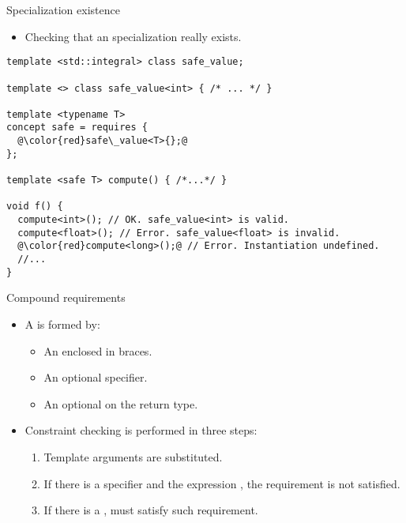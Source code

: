 \begin{frame}[t,fragile]{Specialization existence} 
\begin{itemize}
  \item Checking that an specialization really exists.
\end{itemize}
\begin{lstlisting}[escapechar=@]
template <std::integral> class safe_value;

template <> class safe_value<int> { /* ... */ }

template <typename T>
concept safe = requires {
  @\color{red}safe\_value<T>{};@
};

template <safe T> compute() { /*...*/ }

void f() {
  compute<int>(); // OK. safe_value<int> is valid.
  compute<float>(); // Error. safe_value<float> is invalid.
  @\color{red}compute<long>();@ // Error. Instantiation undefined.
  //...
}
\end{lstlisting}
\end{frame}

\begin{frame}[t,fragile]{Compound requirements}
\begin{itemize}
  \item A  is formed by:
    \begin{itemize}
      \item An  enclosed in braces.
      \item An optional  specifier.
      \item An optional  on the return type.
    \end{itemize}

  \item Constraint checking is performed in three steps:
    \begin{enumerate}
      \item Template arguments are substituted.
      \item If there is a  specifier and the expression
            , the requirement is not satisfied.
      \item If there is a ,
             must satisfy such requirement.
    \end{enumerate}
\end{itemize}
\end{frame}

